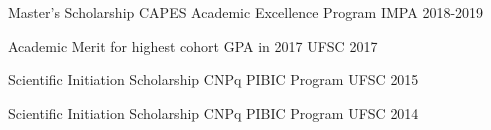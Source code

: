 
\begin{cvhonors}

  \cvhonor
    {Master's Scholarship} %
    {CAPES Academic Excellence Program} %
    {IMPA} %
    {2018-2019} %


  \cvhonor
    {Academic Merit} %
    {for highest cohort GPA in 2017} %
    {UFSC} %
    {2017} %


     \cvhonor
    {Scientific Initiation Scholarship} %
    {CNPq PIBIC Program} %
    {UFSC} %
    {2015} %

     \cvhonor
    {Scientific Initiation Scholarship} %
    {CNPq PIBIC Program} %
    {UFSC} %
    {2014} %




\end{cvhonors}





